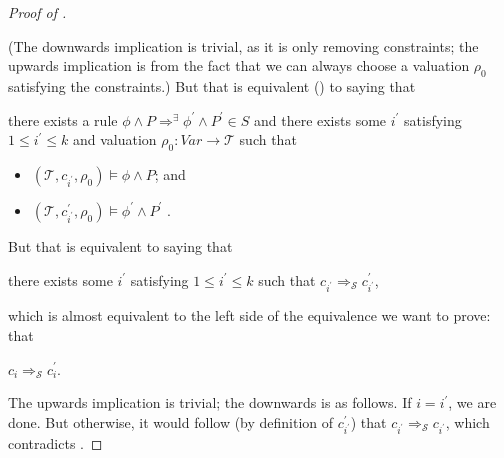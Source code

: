 \begin{proof}[Proof of ]
\begin{proofenv}
\end{proofenv}
(The downwards implication is trivial, as it is only removing constraints; the upwards implication
is from the fact that we can always choose a valuation $\rho_0$ satisfying the constraints.)
But that is equivalent () to saying that 
\begin{proofenv}
there exists a rule $\phi \land P \Rightarrow^\exists \phi^\prime \land P^\prime \in S$
and there exists some $i^\prime$ satisfying $1 \leq i^\prime \leq k$
and valuation $\rho_0 : \mathit{Var} \to \mathcal{T}$ such that
\begin{itemize}
    \item $(\mathcal{T}, c_{i^\prime}, \rho_0) \vDash \phi \land P$; and
    \item $(\mathcal{T}, c^\prime_{i^\prime}, \rho_0) \vDash \phi^\prime \land P^\prime$
    .
\end{itemize}
\end{proofenv}
But that is
equivalent to saying that
\begin{proofenv}
there exists some $i^\prime$ satisfying $1 \leq i^\prime \leq k$
such that $c_{i^\prime} \Rightarrow_{\mathcal{S}} c^\prime_{i^\prime}$,
\end{proofenv}
which is almost equivalent to the left side of the equivalence we want to prove:
that
\begin{proofenv}
$c_{i} \Rightarrow_{\mathcal{S}} c^\prime_{i}$.
\end{proofenv}
The upwards implication is trivial; the downwards is as follows. If $i = i^\prime$, we are done.
But otherwise, it would follow (by definition of $c^\prime_{i^\prime}$) that $c_{i^\prime} \Rightarrow_{\mathcal{S}} c_{i^\prime}$,
which contradicts .
\end{proof}

